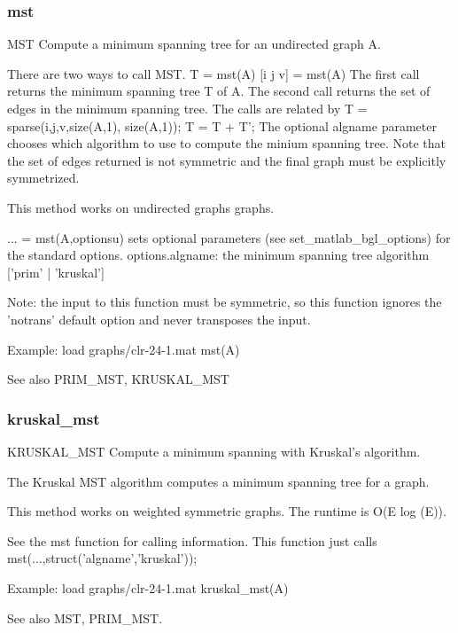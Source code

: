 \subsubsection*{mst}
\begin{mcode}
  MST Compute a minimum spanning tree for an undirected graph A.
 
  There are two ways to call MST.
  T = mst(A)
  [i j v] = mst(A) 
  The first call returns the minimum spanning tree T of A.  
  The second call returns the set of edges in the minimum spanning tree.  
  The calls are related by 
     T = sparse(i,j,v,size(A,1), size(A,1)); 
     T = T + T';
  The optional algname parameter chooses which algorithm to use to compute
  the minium spanning tree.  Note that the set of edges returned is not
  symmetric and the final graph must be explicitly symmetrized.
 
  This method works on undirected graphs graphs.
 
  ... = mst(A,optionsu) sets optional parameters (see 
  set_matlab_bgl_options) for the standard options.
    options.algname: the minimum spanning tree algorithm
      ['prim' | {'kruskal'}]
 
  Note: the input to this function must be symmetric, so this function
  ignores the 'notrans' default option and never transposes the input.
 
  Example:
     load graphs/clr-24-1.mat
     mst(A)
 
  See also PRIM_MST, KRUSKAL_MST
\end{mcode}
\newpage
\subsubsection*{kruskal\_mst}
\begin{mcode}
  KRUSKAL_MST Compute a minimum spanning with Kruskal's algorithm.
 
  The Kruskal MST algorithm computes a minimum spanning tree for a graph.
 
  This method works on weighted symmetric graphs.
  The runtime is O(E log (E)).
 
  See the mst function for calling information.  This function just calls
  mst(...,struct('algname','kruskal'));
 
  Example:
     load graphs/clr-24-1.mat
     kruskal_mst(A)
 
  See also MST, PRIM_MST.
\end{mcode}
\newpage
